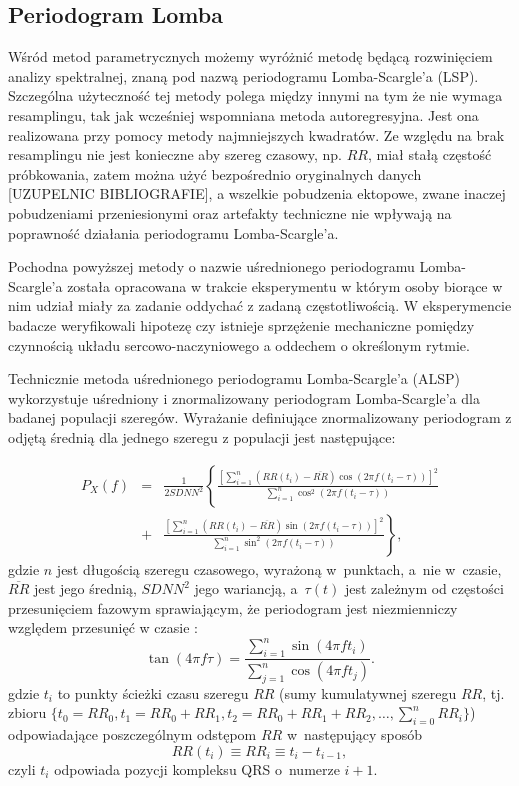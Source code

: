 \subsection{Periodogram Lomba}

Wśród metod parametrycznych możemy wyróżnić metodę będącą rozwinięciem analizy spektralnej,
znaną pod nazwą periodogramu Lomba-Scargle'a (LSP). Szczególna użyteczność tej metody
polega między innymi na tym że nie wymaga resamplingu, tak jak wcześniej wspomniana 
metoda autoregresyjna. Jest ona realizowana przy pomocy metody najmniejszych kwadratów.
Ze względu na brak resamplingu nie jest konieczne aby szereg czasowy, np. $RR$, miał stałą
częstość próbkowania, zatem można użyć bezpośrednio oryginalnych danych [UZUPELNIC BIBLIOGRAFIE],
a wszelkie pobudzenia ektopowe, zwane inaczej pobudzeniami przeniesionymi oraz
artefakty techniczne nie wpływają na poprawność działania periodogramu Lomba-Scargle'a.

Pochodna powyższej metody o nazwie uśrednionego periodogramu Lomba-Scargle'a została
opracowana w trakcie eksperymentu w którym osoby biorące w nim udział miały za zadanie
oddychać z zadaną częstotliwością. W eksperymencie badacze weryfikowali
hipotezę czy istnieje sprzężenie mechaniczne pomiędzy czynnością układu sercowo-naczyniowego
a oddechem o określonym rytmie. 

Technicznie metoda uśrednionego periodogramu Lomba-Scargle'a (ALSP) wykorzystuje uśredniony i
znormalizowany periodogram Lomba-Scargle'a dla badanej populacji szeregów. Wyrażanie
definiujące znormalizowany periodogram z odjętą średnią dla jednego szeregu z populacji
jest następujące:

\begin{eqnarray}
P_{X}(f)&=&\frac{1}{2SDNN^{2}}\left\{\frac{\left[ \sum_{i=1}^{n}(RR(t_{i})-\overline{RR})\cos(2\pi f(t_{i}-\tau))\right]^{2}}{\sum_{i=1}^{n}\cos^{2}(2\pi f(t_{i}-\tau))}\right. \label{LSPeriodogram}\nonumber\\ 
&+&\left. \frac{\left[ \sum_{i=1}^{n}(RR(t_{i})-\overline{RR})\sin(2\pi f(t_{i}-\tau))\right]^{2}}{\sum_{i=1}^{n}\sin^{2}(2\pi f(t_{i}-\tau))}\right\}
\label{eq:lomb} ,
\end{eqnarray}
gdzie $n$ jest długością szeregu czasowego, wyrażoną w~punktach, a~nie w~czasie,
$\overline{RR}$ jest jego średnią, $SDNN^{2}$ jego wariancją, a~$\tau(t)$ jest zależnym od
częstości przesunięciem fazowym sprawiającym, że periodogram jest niezmienniczy względem
przesunięć w czasie \cite{c++,thong,lomb,vanicek}:
\begin{equation}
\tan(4\pi f\tau)=\frac{\sum_{i=1}^{n}\sin(4\pi f t_{i})}{\sum_{j=1}^{n}\cos(4\pi f t_{j})}. \label{tau}
\end{equation}
gdzie $t_{i}$ to punkty ścieżki czasu szeregu $RR$ (sumy kumulatywnej szeregu $RR$, tj.
zbioru $\{t_0=RR_0, t_1=RR_0+RR_1, t_2=RR_0+RR_1+RR_2, \ldots, \sum_{i=0}^n RR_i \}$)
odpowiadające poszczególnym odstępom $RR$ w~następujący sposób
\begin{equation}
RR(t_{i})\equiv RR_{i}\equiv t_{i}-t_{i-1}, \label{RRy}
\end{equation}
czyli $t_{i}$ odpowiada pozycji kompleksu QRS o~numerze $i+1$.

